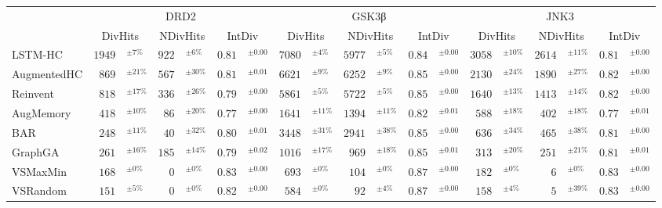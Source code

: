 \begin{tabular}{lr@{}lr@{}lr@{}lr@{}lr@{}lr@{}lr@{}lr@{}lr@{}l}
\toprule
 & \multicolumn{6}{c}{DRD2} & \multicolumn{6}{c}{GSK3β} & \multicolumn{6}{c}{JNK3} \\
\cmidrule(lr){2-7} \cmidrule(lr){8-13} \cmidrule(lr){14-19}
 & \multicolumn{2}{c}{DivHits} & \multicolumn{2}{c}{NDivHits} & \multicolumn{2}{c}{IntDiv} & \multicolumn{2}{c}{DivHits} & \multicolumn{2}{c}{NDivHits} & \multicolumn{2}{c}{IntDiv} & \multicolumn{2}{c}{DivHits} & \multicolumn{2}{c}{NDivHits} & \multicolumn{2}{c}{IntDiv} \\
\midrule
LSTM-HC & $1949$& $^{\pm7\%}$ & $922$& $^{\pm6\%}$ & $0.81$& $^{\pm0.00}$ & $7080$& $^{\pm4\%}$ & $5977$& $^{\pm5\%}$ & $0.84$& $^{\pm0.00}$ & $3058$& $^{\pm10\%}$ & $2614$& $^{\pm11\%}$ & $0.81$& $^{\pm0.00}$ \\
AugmentedHC & $869$& $^{\pm21\%}$ & $567$& $^{\pm30\%}$ & $0.81$& $^{\pm0.01}$ & $6621$& $^{\pm9\%}$ & $6252$& $^{\pm9\%}$ & $0.85$& $^{\pm0.00}$ & $2130$& $^{\pm24\%}$ & $1890$& $^{\pm27\%}$ & $0.82$& $^{\pm0.00}$ \\
Reinvent & $818$& $^{\pm17\%}$ & $336$& $^{\pm26\%}$ & $0.79$& $^{\pm0.00}$ & $5861$& $^{\pm5\%}$ & $5722$& $^{\pm5\%}$ & $0.85$& $^{\pm0.00}$ & $1640$& $^{\pm13\%}$ & $1413$& $^{\pm14\%}$ & $0.82$& $^{\pm0.00}$ \\
AugMemory & $418$& $^{\pm10\%}$ & $86$& $^{\pm20\%}$ & $0.77$& $^{\pm0.00}$ & $1641$& $^{\pm11\%}$ & $1394$& $^{\pm11\%}$ & $0.82$& $^{\pm0.01}$ & $588$& $^{\pm18\%}$ & $402$& $^{\pm18\%}$ & $0.77$& $^{\pm0.01}$ \\
BAR & $248$& $^{\pm11\%}$ & $40$& $^{\pm32\%}$ & $0.80$& $^{\pm0.01}$ & $3448$& $^{\pm31\%}$ & $2941$& $^{\pm38\%}$ & $0.85$& $^{\pm0.00}$ & $636$& $^{\pm34\%}$ & $465$& $^{\pm38\%}$ & $0.81$& $^{\pm0.00}$ \\
GraphGA & $261$& $^{\pm16\%}$ & $185$& $^{\pm14\%}$ & $0.79$& $^{\pm0.02}$ & $1016$& $^{\pm17\%}$ & $969$& $^{\pm18\%}$ & $0.85$& $^{\pm0.01}$ & $313$& $^{\pm20\%}$ & $251$& $^{\pm21\%}$ & $0.81$& $^{\pm0.01}$ \\
VSMaxMin & $168$& $^{\pm0\%}$ & $0$& $^{\pm0\%}$ & $0.83$& $^{\pm0.00}$ & $693$& $^{\pm0\%}$ & $104$& $^{\pm0\%}$ & $0.87$& $^{\pm0.00}$ & $182$& $^{\pm0\%}$ & $6$& $^{\pm0\%}$ & $0.83$& $^{\pm0.00}$ \\
VSRandom & $151$& $^{\pm5\%}$ & $0$& $^{\pm0\%}$ & $0.82$& $^{\pm0.00}$ & $584$& $^{\pm0\%}$ & $92$& $^{\pm4\%}$ & $0.87$& $^{\pm0.00}$ & $158$& $^{\pm4\%}$ & $5$& $^{\pm39\%}$ & $0.83$& $^{\pm0.00}$ \\

\end{tabular}
